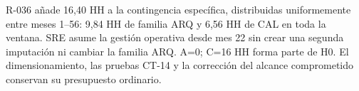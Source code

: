 R-036 añade 16,40 HH a la contingencia específica, distribuidas uniformemente entre meses 1--56: 9,84 HH de familia ARQ y 6,56 HH de CAL en toda la ventana. SRE asume la gestión operativa desde mes 22 sin crear una segunda imputación ni cambiar la familia ARQ. A=0; C=16 HH forma parte de H0. El dimensionamiento, las pruebas CT-14 y la corrección del alcance comprometido conservan su presupuesto ordinario.
